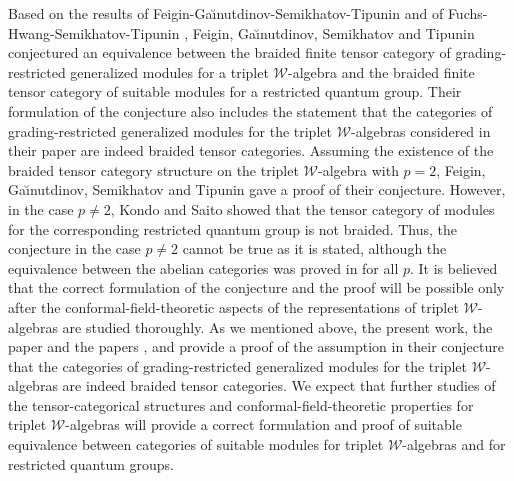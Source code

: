 \documentclass[12pt]{article}
\begin{document}
Based on the results of Feigin-Ga{\u\i}nutdinov-Semikhatov-Tipunin
\cite{FGST3} and of Fuchs-Hwang-Semikhatov-Tipunin \cite{FHST},
Feigin, Ga{\u\i}nutdinov, Semikhatov and Tipunin conjectured
\cite{FGST1} an equivalence between the braided finite tensor category
of grading-restricted generalized modules for a triplet
$\mathcal{W}$-algebra and the braided finite tensor category of
suitable modules for a restricted quantum group.  Their formulation of
the conjecture also includes the statement that the categories of
grading-restricted generalized modules for the triplet
$\mathcal{W}$-algebras considered in their paper are indeed braided
tensor categories.  Assuming the existence of the braided tensor
category structure on the triplet $\mathcal{W}$-algebra with $p=2$,
Feigin, Ga{\u\i}nutdinov, Semikhatov and Tipunin gave a proof of their
conjecture. However, in the case $p\ne 2$, Kondo and Saito \cite{KS}
showed that the tensor category of modules for the corresponding
restricted quantum group is not braided. Thus, the conjecture in the
case $p\ne 2$ cannot be true as it is stated,
although the equivalence between the abelian categories was
proved in \cite{NT2} for all $p$.  It is believed that the
correct formulation of the conjecture and the proof will be possible
only after the conformal-field-theoretic aspects of the
representations of triplet $\mathcal{W}$-algebras are studied
thoroughly.  As we mentioned above, the present work, the paper
\cite{H13} and the papers \cite{A}, \cite{CF} and \cite{AM2} provide a
proof of the assumption in their conjecture that the categories of
grading-restricted generalized modules for the triplet
$\mathcal{W}$-algebras are indeed braided tensor categories. We expect
that further studies of the tensor-categorical structures and
conformal-field-theoretic properties for triplet
$\mathcal{W}$-algebras will provide a correct formulation and proof of
suitable equivalence between categories of suitable modules for
triplet $\mathcal{W}$-algebras and for restricted quantum groups.
\end{document}
